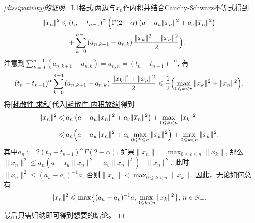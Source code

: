 \begin{proof}[\cref{dissipativity}的证明]
    \cref{L1格式}两边与$x_n$作内积并结合Cauchy-Schwarz不等式得到
    \begin{equation}\label{耗散性-内积放缩}
        \begin{aligned}
            \|x_n\|^2&\leqslant \left(t_n-t_{n-1}\right)^\alpha \Bigl( \Gamma(2-\alpha) \left(a-a_u \|x_n\|^2 + a_v \|\overline x_n\|^2\right)
            \\ &\relphantom{\leqslant} + \sum_{k=0}^{n-1} \left(a_{n,k+1}-a_{n,k}\right) \frac{\|x_k\|^2+\|x_n\|^2}{2}\Bigr).
        \end{aligned}
    \end{equation}
    注意到$\sum_{k=0}^{n-1} \left(a_{n,k+1}-a_{n,k}\right)=a_{n,n}=\left(t_n-t_{n-1}\right)^{-\alpha}$, 有
    \begin{equation}\label{耗散性-求和}
        \left(t_n-t_{n-1}\right)^\alpha \sum_{k=0}^{n-1} \left(a_{n,k+1}-a_{n,k}\right) \frac{\|x_k\|^2+\|x_n\|^2}{2}\leqslant\frac{1}{2}\Bigl(\max_{0\leqslant k<n} \|x_k\|^2 + \|x_n\|^2\Bigr).
    \end{equation}
    将\cref{耗散性-求和}代入\cref{耗散性-内积放缩}得到
    \begin{align*}
        \|x_n\|^2 &\leqslant a_n \left(a-a_u \|x_n\|^2 + a_v \|\overline x_n\|^2\right) + \max_{0\leqslant k<n} \|x_k\|^2
        \\ &\leqslant a_n \Bigl(a-a_u \|x_n\|^2 + a_v \max_{0\leqslant k\leqslant n} \|x_k\|^2\Bigr) + \max_{0\leqslant k<n} \|x_k\|^2,
    \end{align*}
    其中$a_n:=2\left(t_n-t_{n-1}\right)^\alpha \Gamma(2-\alpha)$. 如果$\|x_n\|=\max_{0\leqslant k\leqslant n}\|x_k\|$, 那么$\|x_n\|^2 \leqslant a_n \left(a-a_u \|x_n\|^2 + a_v \|x_n\|^2\right) + \|x_n\|^2$, 此时$\|x_n\|^2 \leqslant (a_u-a_v)^{-1}a$; 否则$\|x_n\|<\max_{0\leqslant k<n}\|x_k\|$.
    因此，无论如何总有
    \begin{equation*}
        \|x_n\|^2\leqslant \max\bigl\{(a_u-a_v)^{-1}a,\max_{0\leqslant k<n}\|x_k\|^2\bigr\},\,n\in\mathbb{N_+}.
    \end{equation*}
    最后只需归纳即可得到想要的结论。
\end{proof}

